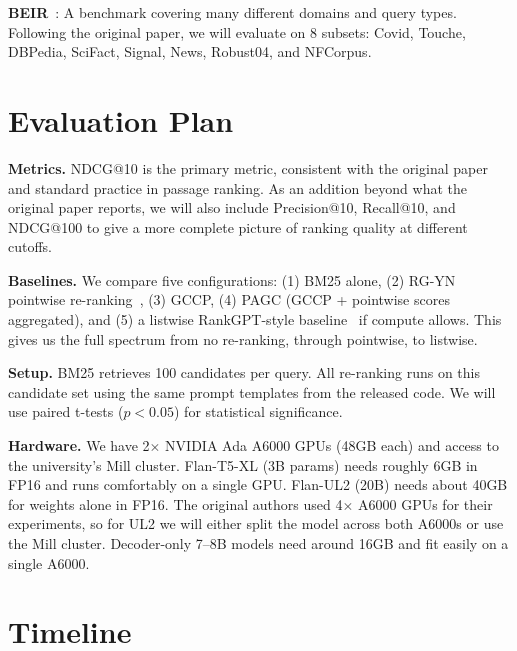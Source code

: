 \documentclass[conference]{IEEEtran}
\begin{document}
\textbf{BEIR}~\cite{thakur2021beir}: A benchmark covering many different domains and query types. Following the original paper, we will evaluate on 8 subsets: Covid, Touche, DBPedia, SciFact, Signal, News, Robust04, and NFCorpus.

\section{Evaluation Plan}

\textbf{Metrics.} NDCG@10 is the primary metric, consistent with the original paper and standard practice in passage ranking. As an addition beyond what the original paper reports, we will also include Precision@10, Recall@10, and NDCG@100 to give a more complete picture of ranking quality at different cutoffs.

\textbf{Baselines.} We compare five configurations: (1) BM25 alone, (2) RG-YN pointwise re-ranking~\cite{long2025precise}, (3) GCCP, (4) PAGC (GCCP + pointwise scores aggregated), and (5) a listwise RankGPT-style baseline~\cite{sun2023chatgpt} if compute allows. This gives us the full spectrum from no re-ranking, through pointwise, to listwise.

\textbf{Setup.} BM25 retrieves 100 candidates per query. All re-ranking runs on this candidate set using the same prompt templates from the released code. We will use paired t-tests ($p < 0.05$) for statistical significance.

\textbf{Hardware.} We have 2$\times$ NVIDIA Ada A6000 GPUs (48GB each) and access to the university's Mill cluster. Flan-T5-XL (3B params) needs roughly 6GB in FP16 and runs comfortably on a single GPU. Flan-UL2 (20B) needs about 40GB for weights alone in FP16. The original authors used 4$\times$ A6000 GPUs for their experiments, so for UL2 we will either split the model across both A6000s or use the Mill cluster. Decoder-only 7--8B models need around 16GB and fit easily on a single A6000.

\section{Timeline}
\end{document}
